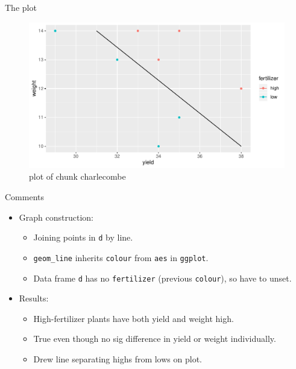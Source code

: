 \documentclass[ignorenonframetext,]{beamer}
\providecommand{\tightlist}{%
  \setlength{\itemsep}{0pt}\setlength{\parskip}{0pt}}
\begin{document}
\begin{frame}{The plot}
\protect\hypertarget{the-plot-6}{}

\begin{figure}
\centering
\includegraphics{figure/charlecombe-1.pdf}
\caption{plot of chunk charlecombe}
\end{figure}

\end{frame}

\begin{frame}[fragile]{Comments}
\protect\hypertarget{comments-19}{}

\begin{itemize}
\tightlist
\item
  Graph construction:

  \begin{itemize}
  \tightlist
  \item
    Joining points in \texttt{d} by line.
  \item
    \texttt{geom\_line} inherits \texttt{colour} from \texttt{aes} in
    \texttt{ggplot}.
  \item
    Data frame \texttt{d} has no \texttt{fertilizer} (previous
    \texttt{colour}), so have to unset.
  \end{itemize}
\item
  Results:

  \begin{itemize}
  \item
    High-fertilizer plants have both yield and weight high.
  \item
    True even though no sig difference in yield or weight individually.
  \item
    Drew line separating highs from lows on plot.
  \end{itemize}
\end{itemize}

\end{frame}
\end{document}
